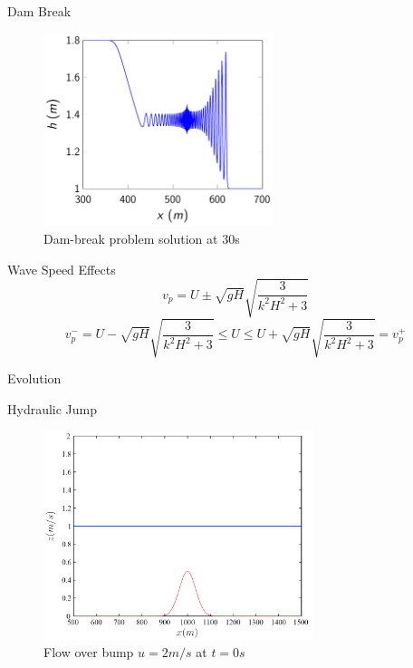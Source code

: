 \documentclass[handout]{beamer}
\begin{document}
\begin{frame}{Dam Break}
	\begin{figure}
		\includegraphics[width=0.6\textwidth]{./Figures/h3.pdf}
		\caption{Dam-break problem solution at 30s}
	\end{figure}
\end{frame}

\begin{frame}{Wave Speed Effects}
	$$ v_p = U \pm \sqrt{gH} \sqrt{\frac{3}{k^2 H^2 +3}} $$
	\pause
	$$ v_p^- =  U - \sqrt{gH}\sqrt{\frac{3}{k^2 H^2 +3}} \le U \le  U +\sqrt{gH}\sqrt{\frac{3}{k^2 H^2 +3}} = v_p^+ $$
\end{frame}

\begin{frame}{Evolution}
	\begin{figure}[ht]
	\end{figure}
\end{frame}

\begin{frame}{Hydraulic Jump}
	\begin{figure}
		\includegraphics[width=0.7\textwidth]{./Figures/ICu=2.png}
		\caption{Flow over bump $u = 2m/s$ at  $t= 0s$}
	\end{figure}
\end{frame}
\end{document}
